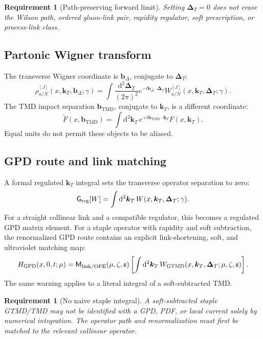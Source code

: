 \documentclass[11pt]{article}
\newtheorem{requirement}[definition]{Requirement}
\newcommand{\kT}{\bm{k}_{T}}
\newcommand{\DT}{\bm{\Delta}_{T}}
\newcommand{\bD}{\bm{b}_{\Delta}}
\newcommand{\bM}{\bm{b}_{\mathrm{TMD}}}
\newcommand{\dd}{\mathrm{d}}
\begin{document}
\begin{requirement}[Path-preserving forward limit]
\label{req:path-preserving-forward}
Setting \(\DT=0\) does not erase the Wilson path, ordered gluon-link pair,
rapidity regulator, soft prescription, or process-link class.
\end{requirement}

\subsection{Partonic Wigner transform}

The transverse Wigner coordinate is \(\bD\), conjugate to \(\DT\):
\begin{equation}
 \rho_{a/N}^{[J]}(x,\kT,\bD;\gamma)
 =\int\frac{\dd^2\DT}{(2\pi)^2}
 e^{-i\bD\cdot\DT}
 W_{a/N}^{[J]}(x,\kT,\DT;\gamma).
\label{eq:wigner-transform}
\end{equation}
The TMD impact separation \(\bM\), conjugate to \(\kT\), is a different
coordinate:
\begin{equation}
 \widetilde F(x,\bM)
 =\int\dd^2\kT\,e^{+i\bM\cdot\kT}F(x,\kT).
\label{eq:tmd-fourier-transform}
\end{equation}
Equal units do not permit these objects to be aliased.

\subsection{GPD route and link matching}

A formal regulated \(\kT\) integral sets the transverse operator separation
to zero:
\begin{equation}
 \mathsf G_{\rm reg}[W]
 =\int\dd^2\kT\,W(x,\kT,\DT;\gamma).
\label{eq:regulated-gpd-integral}
\end{equation}
For a straight collinear link and a compatible regulator, this becomes a
regulated GPD matrix element.  For a staple operator with rapidity and soft
subtraction, the renormalized GPD route contains an explicit link-shortening,
soft, and ultraviolet matching map:
\begin{equation}
 H_{\rm GPD}(x,0,t;\mu)
 =\mathsf M_{\rm link/OPE}(\mu,\zeta,\mathfrak s)
 \left[\int\dd^2\kT\,
 W_{\rm GTMD}(x,\kT,\DT;\mu,\zeta,\mathfrak s)\right].
\label{eq:matched-gpd-route}
\end{equation}
The same warning applies to a literal integral of a soft-subtracted TMD.

\begin{requirement}[No naive staple integral]
\label{req:no-naive-staple-integral}
A soft-subtracted staple GTMD/TMD may not be identified with a GPD, PDF, or
local current solely by numerical integration.  The operator path and
renormalization must first be matched to the relevant collinear operator.
\end{requirement}
\end{document}
